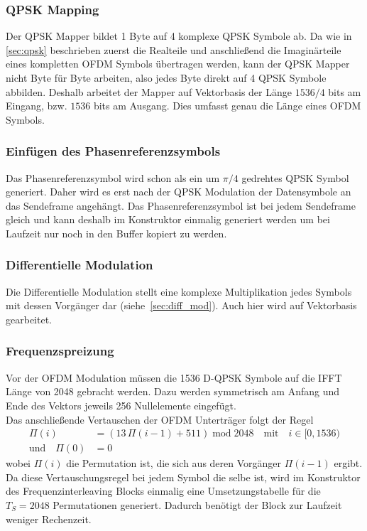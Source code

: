 \subsubsection{QPSK Mapping}
Der QPSK Mapper bildet 1 Byte auf 4 komplexe QPSK Symbole ab. Da wie in \ref{sec:qpsk} beschrieben zuerst die Realteile und anschließend die Imaginärteile eines kompletten OFDM Symbols übertragen werden, kann der QPSK Mapper nicht Byte für Byte arbeiten, also jedes Byte direkt auf 4 QPSK Symbole abbilden. Deshalb arbeitet der Mapper auf Vektorbasis der Länge $1536/4$ bits am Eingang, bzw. $1536$ bits am Ausgang. Dies umfasst genau die Länge eines OFDM Symbols.

\subsubsection{Einfügen des Phasenreferenzsymbols}
Das Phasenreferenzsymbol wird schon als ein um $\pi/4$ gedrehtes QPSK Symbol generiert. Daher wird es erst nach der QPSK Modulation der Datensymbole an das Sendeframe angehängt. Das Phasenreferenzsymbol ist bei jedem Sendeframe gleich und kann deshalb im Konstruktor einmalig generiert werden um bei Laufzeit nur noch in den Buffer kopiert zu werden.

\subsubsection{Differentielle Modulation}
Die Differentielle Modulation stellt eine komplexe Multiplikation jedes Symbols mit dessen Vorgänger dar (siehe~\ref{sec:diff_mod}). Auch hier wird auf Vektorbasis gearbeitet.

\subsubsection{Frequenzspreizung}
Vor der OFDM Modulation müssen die 1536 D-QPSK Symbole auf die IFFT Länge von 2048 gebracht werden. Dazu werden symmetrisch am Anfang und Ende des Vektors jeweils 256 Nullelemente eingefügt.\\
Das anschließende Vertauschen der OFDM Unterträger folgt der Regel
\begin{equation}
\begin{aligned}
\Pi(i) &= (13\, \Pi(i-1) + 511)\; \text{mod}\; 2048 \quad \text{mit} \quad i \in [0,1536)\\
\text{und} \quad \Pi (0) &= 0
\end{aligned}
\end{equation}
wobei $\Pi(i)$ die Permutation ist, die sich aus deren Vorgänger $\Pi(i-1)$ ergibt. Da diese Vertauschungsregel bei jedem Symbol die selbe ist, wird im Konstruktor des Frequenzinterleaving Blocks einmalig eine Umsetzungstabelle für die $T_S=2048$ Permutationen generiert. Dadurch benötigt der Block zur Laufzeit weniger Rechenzeit.

